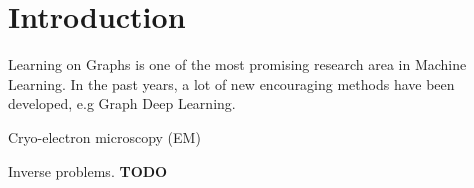 \chapter{Introduction}
\label{sec:introduction}

Learning on Graphs is one of the most promising research area in Machine Learning.
In the past years, a lot of new encouraging methods have been developed, e.g Graph Deep Learning.


Cryo-electron microscopy (EM)

Inverse problems.
\textbf{TODO}